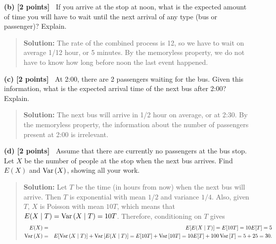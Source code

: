 \documentclass{article}
\newcommand{\svskip}{\vspace{.2in}}
\def\Var{\mathop{\rm Var\,}\nolimits}
\begin{document}
\svskip
{\bf(b) [2 points]\ }  
If you arrive at the stop at noon, what is the expected amount of time you will have to wait until
the next arrival of any type (bus or passenger)?  Explain.
  \begin{quotation}{\bf Solution:}
  The rate of the combined process is 12, so we have to wait on average 1/12 hour, or 5 minutes.
  By the memoryless property, we do not have to know how long before noon the last event happened.
  \end{quotation}

\svskip
{\bf(c) [2 points]\ }  
At 2:00, there are 2 passengers waiting for the bus.
Given this information, what is the expected arrival time of the next bus after 2:00?
Explain.
  \begin{quotation}{\bf Solution:}
  The next bus will arrive in 1/2 hour on average, or at 2:30.  By the memoryless property,
  the information about the number of passengers present at 2:00 is irrelevant.
  \end{quotation}

\svskip 
{\bf(d) [2 points]\ }  
Assume that there are currently no passengers at the bus stop.
Let $X$ be the number of people at the stop when the next bus arrives.
Find $E(X)$ and $\Var(X)$, showing all your work.
  \begin{quotation}{\bf Solution:}
  Let $T$ be the time (in hours from now) when the next bus will arrive.  Then
  $T$ is exponential with mean $1/2$ and variance $1/4$.  Also, 
  given $T$, $X$ is Poisson with mean $10T$, which means that
  $E(X\mid T)=\Var(X\mid T)=10T$.
  Therefore, conditioning on $T$ gives
  \begin{eqnarray*}
  E(X) &=& E[ E(X\mid T) ] = E[ 10T] = 10 E[T] = 5 \\
  \Var(X) &=& E[ \Var(X\mid T)] + \Var[E(X \mid T)] = 
  E[10T] + \Var[10T] = 10E[T] + 100\Var[T] = 5+25=30.
  \end{eqnarray*}
  \end{quotation}
\end{document}
